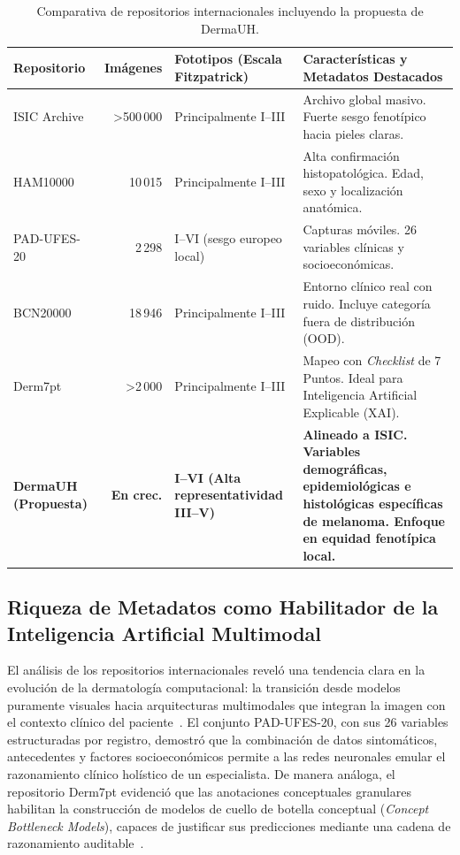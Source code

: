 \begin{table}[htbp]
\centering
\small
\caption{Comparativa de repositorios internacionales incluyendo la propuesta de DermaUH.}\label{tab:comparativa-propuesta}
\begin{tabular}{p{2.5cm}rp{3.5cm}p{6cm}}
\toprule
\textbf{Repositorio} & \textbf{Imágenes} & \textbf{Fototipos (Escala Fitzpatrick)} & \textbf{Características y Metadatos Destacados} \\
\midrule
ISIC Archive & >500\,000 & Principalmente I--III & Archivo global masivo. Fuerte sesgo fenotípico hacia pieles claras. \\
HAM10000 & 10\,015 & Principalmente I--III & Alta confirmación histopatológica. Edad, sexo y localización anatómica. \\
PAD-UFES-20 & 2\,298 & I--VI (sesgo europeo local) & Capturas móviles. 26 variables clínicas y socioeconómicas. \\
BCN20000 & 18\,946 & Principalmente I--III & Entorno clínico real con ruido. Incluye categoría fuera de distribución (OOD). \\
Derm7pt & >2\,000 & Principalmente I--III & Mapeo con \textit{Checklist} de 7 Puntos. Ideal para Inteligencia Artificial Explicable (XAI). \\
\midrule
\textbf{DermaUH (Propuesta)} & \textbf{En crec.} & \textbf{I--VI (Alta representatividad III--V)} & \textbf{Alineado a ISIC. Variables demográficas, epidemiológicas e histológicas específicas de melanoma. Enfoque en equidad fenotípica local.} \\
\bottomrule
\end{tabular}
\end{table}

\subsection{Riqueza de Metadatos como Habilitador de la Inteligencia Artificial Multimodal}

El análisis de los repositorios internacionales reveló una tendencia clara en la evolución de la dermatología computacional: la transición desde modelos puramente visuales hacia arquitecturas multimodales que integran la imagen con el contexto clínico del paciente~\cite{pmc_padufes}. El conjunto PAD-UFES-20, con sus 26 variables estructuradas por registro, demostró que la combinación de datos sintomáticos, antecedentes y factores socioeconómicos permite a las redes neuronales emular el razonamiento clínico holístico de un especialista. De manera análoga, el repositorio Derm7pt evidenció que las anotaciones conceptuales granulares habilitan la construcción de modelos de cuello de botella conceptual (\textit{Concept Bottleneck Models}), capaces de justificar sus predicciones mediante una cadena de razonamiento auditable~\cite{arxiv_derm7pt_concept}.

